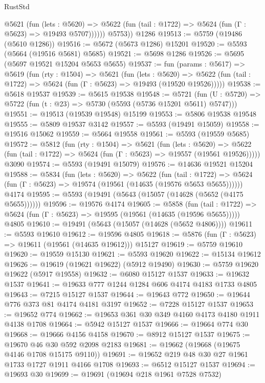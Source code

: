 \begin{lexlean}{RustStd}
\begin{coremodule}
            @5621
              (fun (lets : @5620) =>
              @5622 (fun (tail : @1722) => @5624 (fun (Γ : @5623) => @19493 @5707))))))
        @5753))
    @1286
@19513 := @5759 (@19486 (@5610 @1286))
@19516 := @5672 (@5673 @1286) @15201
@19520 := @5593 (@5664 (@19516 @5681) @5685)
@19521 := @5698 @1286
@19526 := @5695 (@5697 @19521 @15204 @5653 @5655)
@19537 := fun (params : @5617) =>
  @5619
    (fun (rty : @1504) =>
    @5621
      (fun (lets : @5620) =>
      @5622 (fun (tail : @1722) => @5624 (fun (Γ : @5623) => @19493 (@19520 @19526)))))
@19538 := @5618 @19537
@19539 := @5615 @19538
@19548 := @5721
    (fun (U : @5720) => @5722 (fun (t : @23) => @5730 (@5593 (@5736 @15201 @5611) @5747)))
@19551 := @19513 (@19539 @19548) @15199
@19553 := @5806 @19538 @19548
@19555 := @5809 @19537 @3142
@19557 := @5593 (@19491 @15059)
@19558 := @19516 @15062
@19559 := @5664 @19558
@19561 := @5593 (@19559 @5685)
@19572 := @5812
    (fun (rty : @1504) =>
    @5621
      (fun (lets : @5620) =>
      @5622 (fun (tail : @1722) => @5624 (fun (Γ : @5623) => @19557 (@19561 @19526)))))
    @3090
@19574 := @5593 (@19491 @15079)
@19576 := @14636 @19521 @15204
@19588 := @5834
    (fun (lets : @5620) =>
    @5622
      (fun (tail : @1722) =>
      @5624 (fun (Γ : @5623) => @19574 (@19561 (@14635 (@19576 @5653 @5655))))))
    @4174
@19595 := @5593 (@19491 (@5643 (@15057 (@14628 (@5652 (@4175 @5655))))))
@19596 := @19576 @4174
@19605 := @5858
    (fun (tail : @1722) => @5624 (fun (Γ : @5623) => @19595 (@19561 (@14635 (@19596 @5655)))))
    @4805
@19610 := @19491 (@5643 (@15057 (@14628 (@5652 @4806))))
@19611 := @5593 @19610
@19612 := @19596 @4805
@19618 := @5876 (fun (Γ : @5623) => @19611 (@19561 (@14635 @19612))) @15127
@19619 := @5759 @19610
@19620 := @19559 @15130
@19621 := @5593 @19620
@19622 := @15134 @19612
@19626 := @19619 (@19621 @19622) (@5912 @19490)
@19630 := @5759 @19620 @19622 (@5917 @19558)
@19632 := @6080 @15127 @1537
@19633 := @19632 @1537
@19641 := @19633 @777 @1244 @1284 @606 @4174 @4183 @1733 @4805
@19643 := @7215 @15127 @1537
@19644 := @19643 @772
@19650 := @19644 @776 @373 @81 @4174 @4181 @3197
@19652 := @7228 @15127 @1537
@19653 := @19652 @774
@19662 := @19653 @361 @30 @349 @4160 @4173 @4180 @1911 @4138 @1708
@19664 := @5942 @15127 @1537
@19666 := @19664 @774 @30
@19668 := @19666 @4156 @4158
@19670 := @8912 @15127 @1537
@19675 := @19670 @46 @30 @592 @2098 @2183
@19681 := @19662 (@19668 (@19675 @4146 @1708 @15175 @9110))
@19691 := @19652 @219 @48 @30 @27 @1961 @1733 @1727 @1911 @4166 @1708
@19693 := @6512 @15127 @1537
@19694 := @19693 @30
@19699 := @19691 (@19694 @218 @1961 @7528 @7532)

\end{coremodule}
\end{lexlean}
